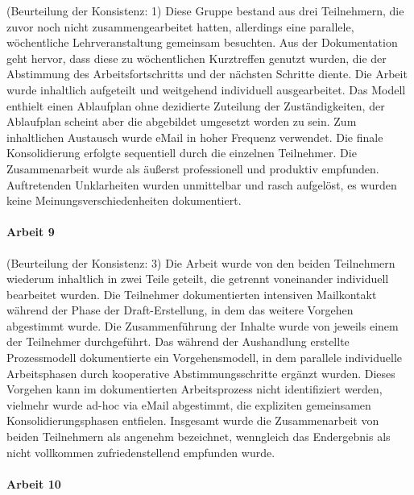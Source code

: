 (Beurteilung der Konsistenz: 1) Diese Gruppe bestand aus drei Teilnehmern, die zuvor noch nicht zusammengearbeitet hatten, allerdings eine parallele, wöchentliche Lehrveranstaltung gemeinsam besuchten. Aus der Dokumentation geht hervor, dass diese zu wöchentlichen Kurztreffen genutzt wurden, die der Abstimmung des Arbeitsfortschritts und der nächsten Schritte diente. Die Arbeit wurde inhaltlich aufgeteilt und weitgehend individuell ausgearbeitet. Das Modell enthielt einen Ablaufplan ohne dezidierte Zuteilung der Zuständigkeiten, der Ablaufplan scheint aber die abgebildet umgesetzt worden zu sein. Zum inhaltlichen Austausch wurde eMail in hoher Frequenz verwendet. Die finale Konsolidierung erfolgte sequentiell durch die einzelnen Teilnehmer. Die Zusammenarbeit wurde als äußerst professionell und produktiv empfunden. Auftretenden Unklarheiten wurden unmittelbar und rasch aufgelöst, es wurden keine Meinungsverschiedenheiten dokumentiert.


\paragraph{Arbeit 9} %
\label{par:arbeit_9}

(Beurteilung der Konsistenz: 3) Die Arbeit wurde von den beiden Teilnehmern wiederum inhaltlich in zwei Teile geteilt, die getrennt voneinander individuell bearbeitet wurden. Die Teilnehmer dokumentierten intensiven Mailkontakt während der Phase der Draft-Erstellung, in dem das weitere Vorgehen abgestimmt wurde. Die Zusammenführung der Inhalte wurde von jeweils einem der Teilnehmer durchgeführt. Das während der Aushandlung erstellte Prozessmodell dokumentierte ein Vorgehensmodell, in dem parallele individuelle Arbeitsphasen durch kooperative Abstimmungsschritte ergänzt wurden. Dieses Vorgehen kann im dokumentierten Arbeitsprozess nicht identifiziert werden, vielmehr wurde ad-hoc via eMail abgestimmt, die expliziten gemeinsamen Konsolidierungsphasen entfielen. Insgesamt wurde die Zusammenarbeit von beiden Teilnehmern als angenehm bezeichnet, wenngleich das Endergebnis als nicht vollkommen zufriedenstellend empfunden wurde.


\paragraph{Arbeit 10} %
\label{par:arbeit_10}

